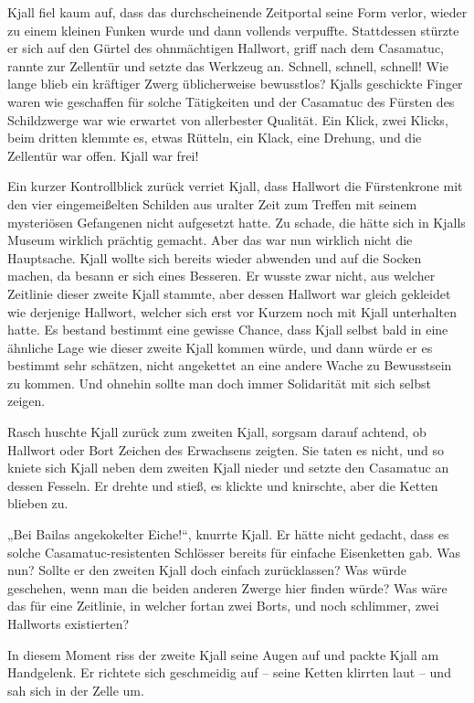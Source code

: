 Kjall fiel kaum auf, dass das durchscheinende Zeitportal seine Form verlor, wieder zu einem kleinen Funken wurde und dann vollends verpuffte. Stattdessen stürzte er sich auf den Gürtel des ohnmächtigen Hallwort, griff nach dem Casamatuc, rannte zur Zellentür und setzte das Werkzeug an. Schnell, schnell, schnell! Wie lange blieb ein kräftiger Zwerg üblicherweise bewusstlos? Kjalls geschickte Finger waren wie geschaffen für solche Tätigkeiten und der Casamatuc des Fürsten des Schildzwerge war wie erwartet von allerbester Qualität. Ein Klick, zwei Klicks, beim dritten klemmte es, etwas Rütteln, ein Klack, eine Drehung, und die Zellentür war offen. Kjall war frei!

Ein kurzer Kontrollblick zurück verriet Kjall, dass Hallwort die Fürstenkrone mit den vier eingemeißelten Schilden aus uralter Zeit zum Treffen mit seinem mysteriösen Gefangenen nicht aufgesetzt hatte. Zu schade, die hätte sich in Kjalls Museum wirklich prächtig gemacht. Aber das war nun wirklich nicht die Hauptsache. Kjall wollte sich bereits wieder abwenden und auf die Socken machen, da besann er sich eines Besseren. Er wusste zwar nicht, aus welcher Zeitlinie dieser zweite Kjall stammte, aber dessen Hallwort war gleich gekleidet wie derjenige Hallwort, welcher sich erst vor Kurzem noch mit Kjall unterhalten hatte. Es bestand bestimmt eine gewisse Chance, dass Kjall selbst bald in eine ähnliche Lage wie dieser zweite Kjall kommen würde, und dann würde er es bestimmt sehr schätzen, nicht angekettet an eine andere Wache zu Bewusstsein zu kommen. Und ohnehin sollte man doch immer Solidarität mit sich selbst zeigen.

Rasch huschte Kjall zurück zum zweiten Kjall, sorgsam darauf achtend, ob Hallwort oder Bort Zeichen des Erwachsens zeigten. Sie taten es nicht, und so kniete sich Kjall neben dem zweiten Kjall nieder und setzte den Casamatuc an dessen Fesseln. Er drehte und stieß, es klickte und knirschte, aber die Ketten blieben zu.

„Bei Bailas angekokelter Eiche!“, knurrte Kjall. Er hätte nicht gedacht, dass es solche Casamatuc-resistenten Schlösser bereits für einfache Eisenketten gab. Was nun? Sollte er den zweiten Kjall doch einfach zurücklassen? Was würde geschehen, wenn man die beiden anderen Zwerge hier finden würde? Was wäre das für eine Zeitlinie, in welcher fortan zwei Borts, und noch schlimmer, zwei Hallworts existierten?

In diesem Moment riss der zweite Kjall seine Augen auf und packte Kjall am Handgelenk. Er richtete sich geschmeidig auf – seine Ketten klirrten laut – und sah sich in der Zelle um.

